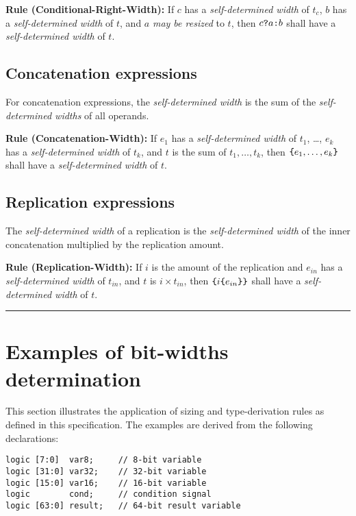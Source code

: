 \documentclass{article}
\newcommand{\sds}{\emph{self-determined width}}
\newcommand{\mbr}{\emph{may be resized}}
\newenvironment{typingrule}[1]%
{\par\noindent\textbf{Rule (#1):} }%
{\par}
\begin{document}
\begin{typingrule}{Conditional-Right-Width}
  If $c$ has a \sds{} of $t_{c}$, $b$ has a
  \sds{} of $t$, and $a$ \mbr{} to $t$,
  then $c \verb|?| a \verb|:| b$ shall have a \sds{} of
  $t$.
\end{typingrule}

\subsection{Concatenation expressions}%

For concatenation expressions, the \sds{} is the sum of the
\emph{self-determined widths} of all operands.

\begin{typingrule}{Concatenation-Width}
  If $e_{1}$ has a \sds{} of $t_{1}$, \ldots, $e_{k}$ has a
  \sds{} of $t_{k}$, and $t$ is the sum of
  $t_{1}, \dots, t_{k}$, then $\verb|{|e_{1}, \dots, e_{k}\verb|}|$ shall have
  a \sds{} of $t$.
\end{typingrule}

\subsection{Replication expressions}%

The \sds{} of a replication is the
\sds{} of the inner concatenation multiplied by the
replication amount.

\begin{typingrule}{Replication-Width}
  If $i$ is the amount of the replication and $e_{in}$ has a
  \sds{} of $t_{in}$, and $t$ is $i \times t_{in}$, then
  $\verb|{| i \verb|{| e_{in}\verb|}}|$ shall have a
  \sds{} of $t$.
\end{typingrule}

\begin{center}
  \noindent\rule{.8\textwidth}{1pt}
\end{center}

\section{Examples of bit-widths determination}
\label{examples}

This section illustrates the application of sizing and type-derivation
rules as defined in this specification. The examples are derived from
the following declarations:

\begin{verbatim}
logic [7:0]  var8;     // 8-bit variable
logic [31:0] var32;    // 32-bit variable
logic [15:0] var16;    // 16-bit variable
logic        cond;     // condition signal
logic [63:0] result;   // 64-bit result variable
\end{verbatim}
\end{document}
